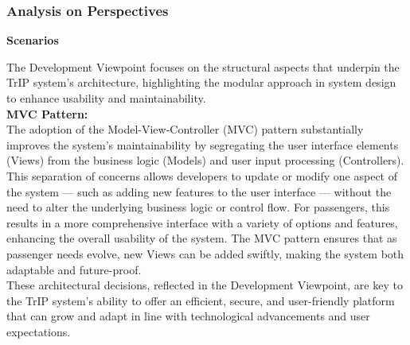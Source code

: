 \subsubsection{Analysis on Perspectives}
\textbf{Scenarios}
\scenarioTwoDevelopment
\scenarioThreeDevelopment

\noindent The Development Viewpoint focuses on the structural aspects that underpin the TrIP system's architecture, highlighting the modular approach in system design to enhance usability and maintainability. \\

\noindent \textbf{MVC Pattern:} \\
The adoption of the Model-View-Controller (MVC) pattern substantially improves the system's maintainability by segregating the user interface elements (Views) from the business logic (Models) and user input processing (Controllers). This separation of concerns allows developers to update or modify one aspect of the system — such as adding new features to the user interface — without the need to alter the underlying business logic or control flow. For passengers, this results in a more comprehensive interface with a variety of options and features, enhancing the overall usability of the system. The MVC pattern ensures that as passenger needs evolve, new Views can be added swiftly, making the system both adaptable and future-proof. \\

These architectural decisions, reflected in the Development Viewpoint, are key to the TrIP system's ability to offer an efficient, secure, and user-friendly platform that can grow and adapt in line with technological advancements and user expectations.
